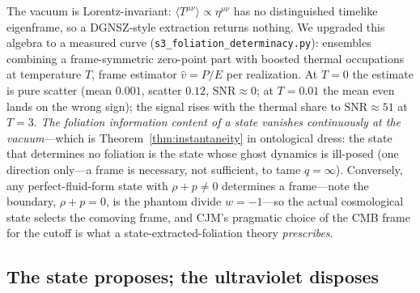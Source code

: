 \documentclass[11pt]{article}
\theoremstyle{definition}
\theoremstyle{remark}
\newcommand{\avg}[1]{\langle #1 \rangle}
\begin{document}
The vacuum is Lorentz-invariant: $\avg{T^{\mu\nu}}\propto
\eta^{\mu\nu}$ has no distinguished timelike eigenframe, so a
DGNSZ-style extraction \cite{DGNSZ2014} returns nothing. We upgraded
this algebra to a measured curve
(\texttt{s3\_foliation\_determinacy.py}): ensembles combining a
frame-symmetric zero-point part with boosted thermal occupations at
temperature $T$, frame estimator $\hat v=P/E$ per realization. At
$T=0$ the estimate is pure scatter (mean $0.001$, scatter $0.12$,
$\mathrm{SNR}\approx0$; at $T=0.01$ the mean even lands on the wrong
sign); the signal rises with the thermal share to
$\mathrm{SNR}\approx51$ at $T=3$. \emph{The foliation information
content of a state vanishes continuously at the vacuum}---which is
Theorem~\ref{thm:instantaneity} in ontological dress: the state that
determines no foliation is the state whose ghost dynamics is
ill-posed (one direction only---a frame is necessary, not sufficient, to
tame $q=\infty$). Conversely, any perfect-fluid-form state with $\rho+p\neq0$ determines a
frame---note the boundary, $\rho+p=0$, is the phantom divide
$w=-1$---so the actual cosmological state selects the comoving frame,
and CJM's pragmatic choice of the CMB frame for the cutoff
\cite{CJM2004} is what a state-extracted-foliation theory
\emph{prescribes}.

\subsection{The state proposes; the ultraviolet disposes}
\end{document}
